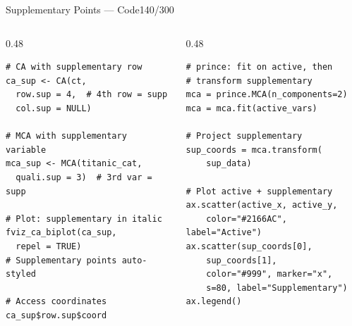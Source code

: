 \documentclass[10pt]{beamer}
\newcommand{\smark}[1]{\hfill{\scriptsize\color{codegray}#1}}
\begin{document}
\begin{frame}[fragile]{Supplementary Points --- Code}\smark{140/300}
\begin{columns}[T]
\begin{column}{0.48\textwidth}
\begin{lstlisting}[style=Rstyle]
# CA with supplementary row
ca_sup <- CA(ct,
  row.sup = 4,  # 4th row = supp
  col.sup = NULL)

# MCA with supplementary variable
mca_sup <- MCA(titanic_cat,
  quali.sup = 3)  # 3rd var = supp

# Plot: supplementary in italic
fviz_ca_biplot(ca_sup,
  repel = TRUE)
# Supplementary points auto-styled

# Access coordinates
ca_sup$row.sup$coord
\end{lstlisting}
\end{column}
\begin{column}{0.48\textwidth}
\begin{lstlisting}[style=Pystyle]
# prince: fit on active, then
# transform supplementary
mca = prince.MCA(n_components=2)
mca = mca.fit(active_vars)

# Project supplementary
sup_coords = mca.transform(
    sup_data)

# Plot active + supplementary
ax.scatter(active_x, active_y,
    color="#2166AC", label="Active")
ax.scatter(sup_coords[0],
    sup_coords[1],
    color="#999", marker="x",
    s=80, label="Supplementary")
ax.legend()
\end{lstlisting}
\end{column}
\end{columns}
\end{frame}
\end{document}
